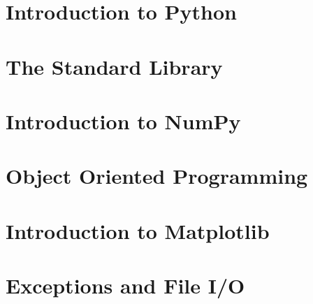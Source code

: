 
\section*{Introduction to Python} %

\section*{The Standard Library} %

\section*{Introduction to NumPy} %

\section*{Object Oriented Programming} %

\section*{Introduction to Matplotlib} %

\section*{Exceptions and File I/O} %
